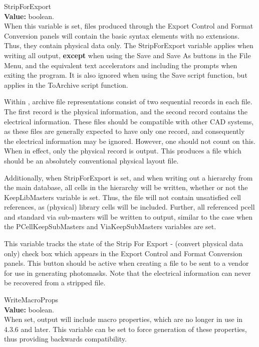 \begin{description}
\item{\et StripForExport}\\
{\bf Value:} boolean.\\
When this variable is set, files produced through the {\cb Export
Control} and {\cb Format Conversion} panels will contain the basic
syntax elements with no extensions.  Thus, they contain physical data
only.  The {\et StripForExport} variable applies when writing all
output, {\bf except} when using the {\cb Save} and {\cb Save As}
buttons in the {\cb File Menu}, and the equivalent text accelerators
and including the prompts when exiting the program.  It is also
ignored when using the {\vt Save} script function, but applies in the
{\vt ToArchive} script function.

Within {\Xic}, archive file representations consist of two sequential
records in each file.  The first record is the physical information,
and the second record contains the electrical information.  These
files should be compatible with other CAD systems, as these files are
generally expected to have only one record, and consequently the
electrical information may be ignored.  However, one should not count
on this.  When in effect, only the physical record is output.  This
produces a file which should be an absolutely conventional physical
layout file.

Additionally, when {\et StripForExport} is set, and when writing out a
hierarchy from the main database, all cells in the hierarchy will be
written, whether or not the {\et KeepLibMasters} variable is set. 
Thus, the file will not contain unsatisfied cell references, as
(physical) library cells will be included.  Further, all referenced
pcell and standard via sub-masters will be written to output, similar
to the case when the {\et PCellKeepSubMasters} and {\et
ViaKeepSubMasters} variables are set. 

This variable tracks the state of the {\cb Strip For Export - (convert
physical data only)} check box which appears in the {\cb Export
Control} and {\cb Format Conversion} panels.  This button should be
active when creating a file to be sent to a vendor for use in
generating photomasks.  Note that the electrical information can never
be recovered from a stripped file.

\item{\et WriteMacroProps}\\
{\bf Value:} boolean.\\
When set, output will include {\et macro} properties, which are no
longer in use in 4.3.6 and later.  This variable can be set to force
generation of these properties, thus providing backwards
compatibility.


\end{description}
